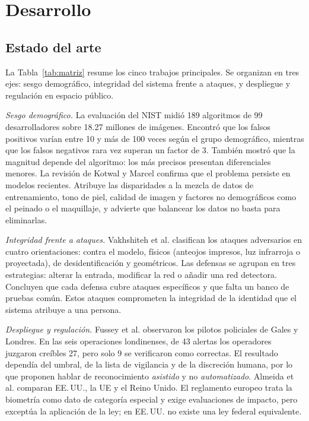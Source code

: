 %
\section{Desarrollo}
\label{sec:desarrollo}

\subsection{Estado del arte}
\label{subsec:estadodelarte}

La Tabla~\ref{tab:matriz} resume los cinco trabajos principales. Se
organizan en tres ejes: sesgo demogr\'afico, integridad del sistema frente
a ataques, y despliegue y regulaci\'on en espacio p\'ublico.

\textit{Sesgo demogr\'afico.} La evaluaci\'on del NIST
\cite{grother_nistir8280_2019} midi\'o 189 algoritmos de 99 desarrolladores
sobre 18.27 millones de im\'agenes. Encontr\'o que los falsos positivos
var\'ian entre 10 y m\'as de 100 veces seg\'un el grupo demogr\'afico,
mientras que los falsos negativos rara vez superan un factor de 3. Tambi\'en
mostr\'o que la magnitud depende del algoritmo: los m\'as precisos presentan
diferenciales menores. La revisi\'on de Kotwal y Marcel
\cite{kotwal_fairness_2026} confirma que el problema persiste en modelos
recientes. Atribuye las disparidades a la mezcla de datos de entrenamiento,
tono de piel, calidad de imagen y factores no demogr\'aficos como el peinado
o el maquillaje, y advierte que balancear los datos no basta para
eliminarlas.

\textit{Integridad frente a ataques.} Vakhshiteh et al.
\cite{vakhshiteh_adversarial_2021} clasifican los ataques adversarios en
cuatro orientaciones: contra el modelo, f\'isicos (anteojos impresos, luz
infrarroja o proyectada), de desidentificaci\'on y geom\'etricos. Las
defensas se agrupan en tres estrategias: alterar la entrada, modificar la
red o a\~nadir una red detectora. Concluyen que cada defensa cubre ataques
espec\'ificos y que falta un banco de pruebas com\'un. Estos ataques
comprometen la integridad de la identidad que el sistema atribuye a una
persona.

\textit{Despliegue y regulaci\'on.} Fussey et al.
\cite{fussey_assisted_2020} observaron los pilotos policiales de Gales y
Londres. En las seis operaciones londinenses, de 43 alertas los operadores
juzgaron cre\'ibles 27, pero solo 9 se verificaron como correctas. El
resultado depend\'ia del umbral, de la lista de vigilancia y de la
discreci\'on humana, por lo que proponen hablar de reconocimiento
\emph{asistido} y no \emph{automatizado}. Almeida et al.
\cite{almeida_ethics_2022} comparan EE.\,UU., la UE y el Reino Unido. El
reglamento europeo trata la biometr\'ia como dato de categor\'ia especial y
exige evaluaciones de impacto, pero exceptúa la aplicaci\'on de la ley; en
EE.\,UU. no existe una ley federal equivalente.

